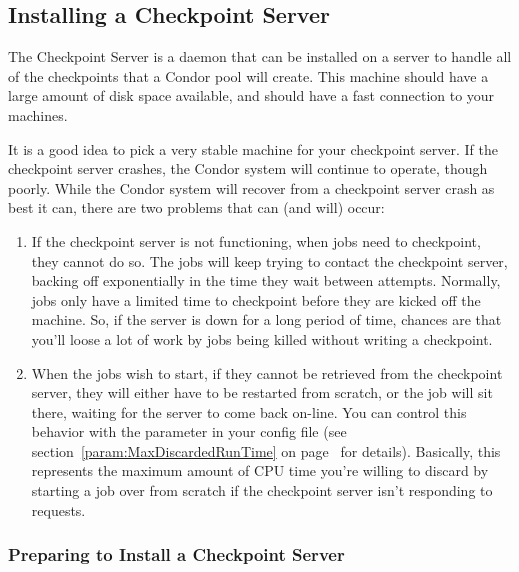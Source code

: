 \subsection{\label{sec:Ckpt-Server}
Installing a Checkpoint Server}

The Checkpoint Server is a daemon that can be installed on a server to
handle all of the checkpoints that a Condor pool will create.
This machine should have a large amount of disk space available, and
should have a fast connection to your machines.

\Note It is a good idea to pick a very stable machine for your checkpoint
server.
If the checkpoint server crashes, the Condor system will continue to
operate, though poorly.  
While the Condor system will recover from a checkpoint server crash
as best it can, there are two problems that can (and will) occur:
\begin{enumerate}

\item If the checkpoint server is not functioning, when jobs need to
checkpoint, they cannot do so.
The jobs will keep trying to contact the checkpoint server, backing
off exponentially in the time they wait between attempts.
Normally, jobs only have a limited time to checkpoint before they are
kicked off the machine.
So, if the server is down for a long period of time, chances are that
you'll loose a lot of work by jobs being killed without writing a
checkpoint. 

\item When the jobs wish to start, if they cannot be retrieved from
the checkpoint server, they will either have to be restarted from
scratch, or the job will sit there, waiting for the server to come
back on-line.
You can control this behavior with the
 parameter in your config file (see
section~\ref{param:MaxDiscardedRunTime} on
page~\pageref{param:MaxDiscardedRunTime} for details).
Basically, this represents the maximum amount of CPU time you're
willing to discard by starting a job over from scratch if the
checkpoint server isn't responding to requests.

\end{enumerate}

\subsubsection{\label{sec:Prepare-Ckpt-Server}
Preparing to Install a Checkpoint Server} 

